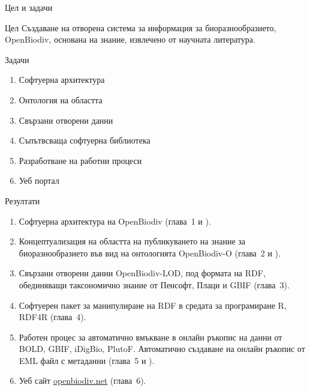 \documentclass[bulgarian]{beamer}
\begin{document}
\begin{frame}{Цел и задачи}

\begin{alertblock}{Цел}
Създаване на отворена система за информация за биоразнообразието, OpenBiodiv, основана на знание, извлечено от научната литература.
\end{alertblock}

\begin{block}{Задачи}
\begin{enumerate}

\item{Софтуерна архитектура} 

\item{Онтология на областта}

\item{Свързани отворени данни}

\item{Съпътвсваща софтуерна библиотека}

\item{Разработване на работни процеси}

\item{Уеб портал} 

\end{enumerate}
\end{block}
\end{frame}

\begin{frame}{Резултати}

\begin{enumerate}
    \item Софтуерна архитектура на OpenBiodiv (глава~1 и \cite{senderov_open_2016}).
    \item Концептуализация на областта на публикуването на знание за биоразнообразието във вид на онтологията OpenBiodiv-O (глава~2 и \cite{senderov_openbiodiv-o:_2018}). 
    \item Свързани отворени данни OpenBiodiv-LOD, под формата на RDF, обединяващи таксономично знание от Пенсофт, Плаци и GBIF (глава~3).
    \item Софтуерен пакет за манипулиране на RDF в средата за програмиране R, RDF4R (глава~4).
    \item Работен процес за автоматично вмъкване в онлайн ръкопис на данни от BOLD, GBIF, iDigBio, PlutoF. Автоматично създаване на онлайн ръкопис от EML файл с метаданни (глава~5 и \cite{senderov_online_2016}).
    \item Уеб сайт \href{http://openbiodiv.net}{openbiodiv.net} (глава~6).

\end{enumerate}

\end{frame}
\end{document}
